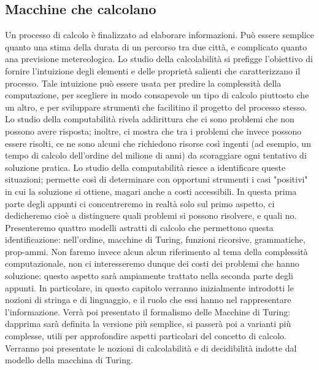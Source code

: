 \subsection{Macchine che calcolano}

Un processo di calcolo è finalizzato ad elaborare informazioni.
Può essere semplice quanto una stima della durata di un percorso tra due città,
e complicato quanto ana previsione metereologica.
Lo studio della calcolabilità si prefigge l'obiettivo
di fornire l'intuizione degli elementi e delle proprietà salienti che
caratterizzano il processo.
Tale intuizione può essere usata per predire la complessità della computazione,
per scegliere in modo consapevole un tipo di calcolo piuttosto che un
altro, e per sviluppare strumenti che facilitino il progetto del processo stesso.
Lo studio della computabilità rivela addirittura che ci sono problemi che non
possono avere risposta; inoltre, ci mostra che tra i problemi che invece possono
essere risolti, ce ne sono alcuni che richiedono risorse così ingenti
(ad esempio, un tempo di calcolo dell'ordine del milione di anni) da scoraggiare
ogni tentativo di soluzione pratica. Lo studio della computabilità riesce a
identificare queste situazioni; permette così di determinare con opportuni
strumenti i casi "positivi" in cui la soluzione si ottiene, magari anche a
costi accessibili.
In questa prima parte degli appunti ci concentreremo in realtà solo sul primo aspetto,
ci dedicheremo cioè a distinguere quali problemi si possono risolvere, e quali no.
Presenteremo quattro modelli astratti di calcolo che permettono questa
identificazione: nell'ordine, macchine di Turing, funzioni ricorsive,
grammatiche, prop-ammi. Non faremo invece alcun alcun riferimento al tema
della complessità computazionale, non ci interesseremo dunque dei costi dei
problemi che hanno soluzione: questo aspetto sarà ampiamente trattato nella
seconda parte degli appunti.
In particolare, in questo capitolo verranno inizialmente introdotti le nozioni di
stringa e di linguaggio, e il ruolo che essi hanno nel rappresentare l'informazione.
Verrà poi presentato il formalismo delle Macchine di Turing: dapprima sarà
definita la versione più semplice, si passerà poi a varianti più complesse,
utili per approfondire aspetti particolari del concetto di calcolo.
Verranno poi presentate le nozioni di calcolabilità e di decidibilità
indotte dal modello della macchina di Turing.